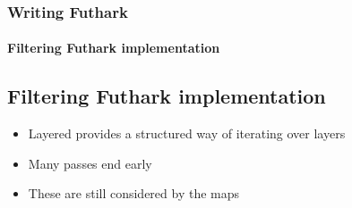 \documentclass[12pt,t]{beamer}
\begin{document}
\begin{frame}
  \frametitle{Writing Futhark}
  \framesubtitle{Filtering Futhark implementation}
\subsection{Filtering Futhark implementation}

\begin{itemize}
  \item Layered provides a structured way of iterating over layers
  \item Many passes end early
  \item These are still considered by the maps
\end{itemize}

%
%
%
%

\end{frame}
\end{document}
